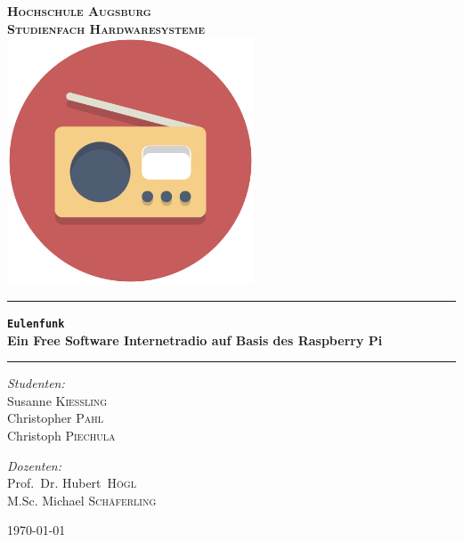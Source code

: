 \begin{titlepage}
\pagecolor{titlepagecolor}
\begin{center}

\bf
\color{titlepagefontcolor}
\textsc{\huge Hochschule Augsburg}\\[1.5cm]
\textsc{\LARGE Studienfach Hardwaresysteme}\\[0.5cm]
\vspace{1em}
\includegraphics[width=0.55\textwidth]{images/title.png}~\\[1cm]

\rule{\linewidth}{0.5mm}
{\Huge \bfseries \frqq\texttt{Eulenfunk}\flqq \\ \Large{Ein Free Software
        Internetradio auf
Basis des Raspberry Pi}\\[0.4cm]}
\rule{\linewidth}{0.5mm}

\noindent
\begin{minipage}[t]{0.4\textwidth}
\begin{flushleft} \Large
\emph{Studenten:}\\
\textnormal{Susanne \textsc{Kießling}} \\
\textnormal{Christopher \textsc{Pahl}} \\
\textnormal{Christoph \textsc{Piechula}}
\end{flushleft}
\end{minipage}%
\begin{minipage}[t]{0.4\textwidth}
\begin{flushright} \Large
\emph{Dozenten:} \\
\textnormal{Prof.\ Dr. Hubert\  \textsc{Högl}} \\
\textnormal{M.Sc. Michael \textsc{Schäferling}} 

\end{flushright}
\end{minipage}

\vfill

{\large \today}
\end{center}
\end{titlepage}
\nopagecolor


